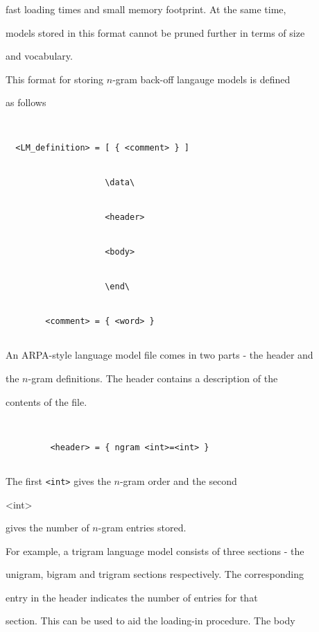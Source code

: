 fast loading times and small memory footprint. At the same time,


models stored in this format cannot be pruned further in terms of size


and vocabulary.









This format for storing $n$-gram back-off langauge models is defined


as follows


\begin{verbatim}


  <LM_definition> = [ { <comment> } ] 


                    \data\ 


                    <header> 


                    <body> 


                    \end\


        <comment> = { <word> }


\end{verbatim}


An ARPA-style language model file comes in two parts - the header and


the $n$-gram definitions. The header contains a description of the


contents of the file.


\begin{verbatim}


         <header> = { ngram <int>=<int> }


\end{verbatim}


The first {\tt <int>} gives the $n$-gram order and the second {\tt


<int>} gives the number of $n$-gram entries stored.





For example, a trigram language model consists of three sections - the


unigram, bigram and trigram sections respectively. The corresponding


entry in the header indicates the number of entries for that


section. This can be used to aid the loading-in procedure. The body


